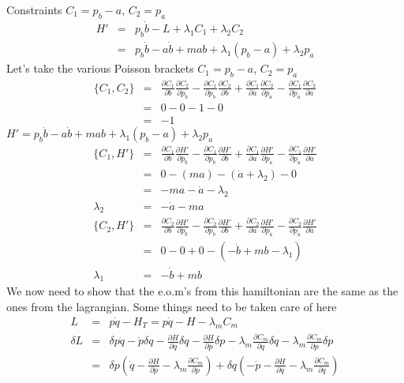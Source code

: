 \documentclass[aps,preprint,preprintnumbers,nofootinbib,showpacs,prd]{revtex4-1}
\newcommand{\nbea}{\begin{eqnarray*}}
\newcommand{\neea}{\end{eqnarray*}}
\begin{document}
Constraints $C_1 = p_b - a$, $C_2 = p_a$
%
\nbea
H' & = & p_b \dot b - L + \lambda_1 C_1 + \lambda_2 C_2\\
& = & p_b \dot b - a\dot b + m ab + \lambda_1 (p_b - a) + \lambda_2 p_a
\neea
%
Let's take the various Poisson brackets $C_1 = p_b - a$, $C_2 = p_a$
%
\nbea
\{C_1, C_2\} & = & \frac{\partial C_1}{\partial b}\frac{\partial C_2}{\partial p_b} - \frac{\partial C_1}{\partial p_b}\frac{\partial C_2}{\partial b} + \frac{\partial C_1}{\partial a}\frac{\partial C_2}{\partial p_a} - \frac{\partial C_1}{\partial p_a}\frac{\partial C_2}{\partial a} \\
& = & 0 - 0 - 1 - 0 \\
& = & -1
\neea
%
$H' = p_b \dot b - a\dot b + m ab + \lambda_1 (p_b - a) + \lambda_2 p_a$
%
\nbea
\{C_1, H'\} & = & \frac{\partial C_1}{\partial b}\frac{\partial H'}{\partial p_b} - \frac{\partial C_1}{\partial p_b}\frac{\partial H'}{\partial b} + \frac{\partial C_1}{\partial a}\frac{\partial H'}{\partial p_a} - \frac{\partial C_1}{\partial p_a}\frac{\partial H'}{\partial a} \\
& = & 0 - (ma) - (\dot a + \lambda_2) - 0 \\
& = & -ma - \dot a - \lambda_2 \\
\lambda_2 & = & -\dot a - ma  
\neea
%
%
\nbea
\{C_2, H'\} & = & \frac{\partial C_2}{\partial b}\frac{\partial H'}{\partial p_b} - \frac{\partial C_2}{\partial p_b}\frac{\partial H'}{\partial b} + \frac{\partial C_2}{\partial a}\frac{\partial H'}{\partial p_a} - \frac{\partial C_2}{\partial p_a}\frac{\partial H'}{\partial a} \\
& = & 0 - 0 + 0 -(-\dot b + mb - \lambda_1) \\
\lambda_1 & = & - \dot b + mb
\neea
%
We now need to show that the e.o.m's from this hamiltonian are the same as the ones from the lagrangian. Some things need to be taken care of here
%
\nbea
L & = & p\dot q - H_T = p\dot q - H - \lambda_m C_m \\
\delta L & = & \delta p \dot q - \dot p \delta q - \frac{\partial H}{\partial q} \delta q - \frac{\partial H}{\partial p}\delta p - \lambda_m \frac{\partial C_m}{\partial q}\delta q - \lambda_m \frac{\partial C_m}{\partial p}\delta p \\
& = & \delta p \left ( \dot q  - \frac{\partial H}{\partial p} - \lambda_m \frac{\partial C_m}{\partial p} \right ) + \delta q \left ( - \dot p - \frac{\partial H}{\partial q} - \lambda_m \frac{\partial C_m}{\partial q}\right )
\neea
%
\end{document}
